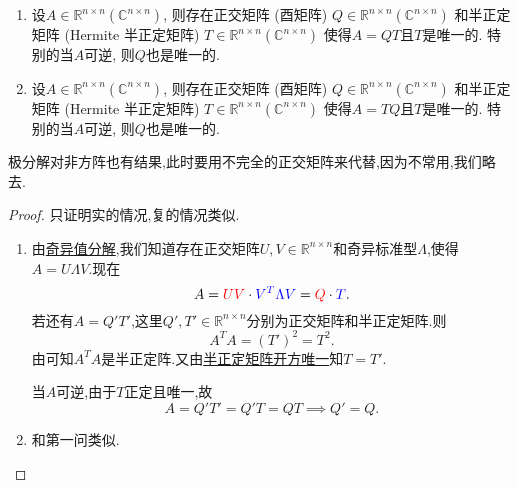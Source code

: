 \documentclass[../../main.tex]{subfiles}
\begin{document}
\begin{theorem}[极分解]\label{theorem:极分解}
\begin{enumerate}
\item 设\( A \in \mathbb{R}^{n \times n} (\mathbb{C}^{n \times n}) \), 则存在正交矩阵 (酉矩阵) \( Q \in \mathbb{R}^{n \times n} (\mathbb{C}^{n \times n}) \) 和半正定矩阵 (Hermite 半正定矩阵) \( T \in \mathbb{R}^{n \times n} (\mathbb{C}^{n \times n}) \) 使得\( A = QT \)且\( T \)是唯一的. 特别的当\( A \)可逆, 则\( Q \)也是唯一的.

\item 设\( A \in \mathbb{R}^{n \times n} (\mathbb{C}^{n \times n}) \), 则存在正交矩阵 (酉矩阵) \( Q \in \mathbb{R}^{n \times n} (\mathbb{C}^{n \times n}) \) 和半正定矩阵 (Hermite 半正定矩阵) \( T \in \mathbb{R}^{n \times n} (\mathbb{C}^{n \times n}) \) 使得\( A = TQ \)且\( T \)是唯一的. 特别的当\( A \)可逆, 则\( Q \)也是唯一的.
\end{enumerate}
\end{theorem}
\begin{note}
极分解对非方阵也有结果,此时要用不完全的正交矩阵来代替,因为不常用,我们略去.
\end{note}
\begin{proof}
只证明实的情况,复的情况类似.
\begin{enumerate}
\item 由\hyperref[theorem:奇异值分解]{奇异值分解},我们知道存在正交矩阵\( U, V \in \mathbb{R}^{n \times n} \)和奇异标准型\( \Lambda \),使得\( A = U \Lambda V \).现在
\[
A = {\color{red} UV} \cdot {\color{blue} V^T \Lambda V} = {\color{red} Q} \cdot {\color{blue} T}.
\]
若还有\( A = Q'T' \),这里\( Q', T' \in \mathbb{R}^{n \times n} \)分别为正交矩阵和半正定矩阵.则
\[
A^T A = (T')^2 = T^2.
\]
由可知$A^TA$是半正定阵.又由\hyperref[theorem:半正定矩阵开方唯一]{半正定矩阵开方唯一}知\( T = T' \).

当\( A \)可逆,由于\( T \)正定且唯一,故
\[
A = Q'T' =Q'T= QT \implies Q' = Q.
\]

\item 和第一问类似.
\end{enumerate}
\end{proof}
\end{document}
